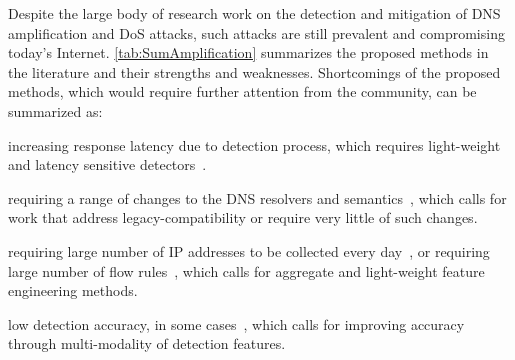 Despite the large body of research work on the detection and mitigation of DNS amplification and DoS attacks, such attacks are still prevalent and compromising today's Internet. \autoref{tab:SumAmplification} summarizes the proposed methods in the literature and their strengths and weaknesses. Shortcomings of the proposed methods, which would require further attention from the community, can be summarized as: 
\begin{enumerate*}
    \item increasing response latency due to detection process, which requires light-weight and latency sensitive detectors~.
    \item requiring a range of changes to the DNS resolvers and semantics~, which calls for work that address legacy-compatibility or require very little of such changes. 
    \item requiring large number of IP addresses to be collected every day~, or requiring large number of flow rules~, which calls for aggregate and light-weight feature engineering methods. 
    \item low detection accuracy, in some cases~, which calls for improving accuracy through multi-modality of detection features. 
\end{enumerate*}

